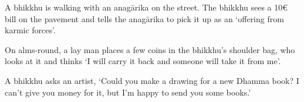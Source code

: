 \begin{exam}{\autoExamName}
\begin{problem*}
\begin{parts}
    \item {} A bhikkhu is walking with an anagārika on the street. The
      bhikkhu sees a 10€ bill on the pavement and tells the anagārika to pick it
      up as an `offering from karmic forces'.

    \item {} On alms-round, a lay man places a few coins in the bhikkhu's
      shoulder bag, who looks at it and thinks `I will carry it back and someone
      will take it from me'.

    \item {} A bhikkhu asks an artist, `Could you make a drawing for a new
      Dhamma book? I can't give you money for it, but I'm happy to send you some
      books.'

    \end{parts}
    
  \end{problem*}

\end{exam}

